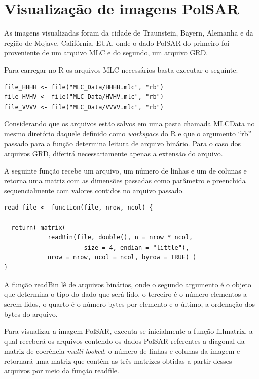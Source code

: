 \documentclass[12pt]{article}
\begin{document}
\section{Visualização de imagens PolSAR}

As imagens visualizadas foram da cidade de Traunstein, Bayern, Alemanha e da região de Mojave, Califórnia, EUA, onde o dado PolSAR do primeiro foi proveniente de um arquivo \href{https://uavsar.jpl.nasa.gov/cgi-bin/product.pl?jobName=trauns_22551_15087_016_150604_L090_CX_01#data}{MLC} e do segundo, um arquivo \href{https://uavsar.jpl.nasa.gov/cgi-bin/product.pl?jobName=mmmmoj_18030_17050_005_170519_PL09043020_XX_01#data
}{GRD}.

Para carregar no R os arquivos MLC necessários basta executar o seguinte:
\begin{verbatim}
file_HHHH <- file("MLC_Data/HHHH.mlc", "rb")
file_HVHV <- file("MLC_Data/HVHV.mlc", "rb")
file_VVVV <- file("MLC_Data/VVVV.mlc", "rb")
\end{verbatim}

Considerando que os arquivos estão salvos em uma pasta chamada MLC\textunderscore Data no mesmo diretório daquele definido como \textit{workspace} do R e que o argumento ``rb'' passado para a função determina leitura de arquivo binário. Para o caso dos arquivos GRD, diferirá necessariamente apenas a extensão do arquivo.

A seguinte função recebe um arquivo, um número de linhas e um de colunas e retorna uma matriz com as dimensões passadas como parâmetro e preenchida sequencialmente com valores contidos no arquivo passado. 

\begin{verbatim}
read_file <- function(file, nrow, ncol) {

  return( matrix(
            readBin(file, double(), n = nrow * ncol, 
                      size = 4, endian = "little"), 
            nrow = nrow, ncol = ncol, byrow = TRUE) )
}
\end{verbatim}
A função readBin lê de arquivos binários, onde o segundo argumento é o objeto que determina o tipo do dado que será lido, o terceiro é o número elementos a serem lidos, o quarto é o número bytes por elemento e o último, a ordenação dos bytes do arquivo. 

Para visualizar a imagem PolSAR, executa-se inicialmente a função fill\textunderscore matrix, a qual receberá os arquivos contendo os dados PolSAR referentes a diagonal da matriz de coerência \textit{multi-looked}, o número de linhas e colunas da imagem e retornará uma matriz que contém as três matrizes obtidas a partir desses arquivos por meio da função read\textunderscore file.
\end{document}
